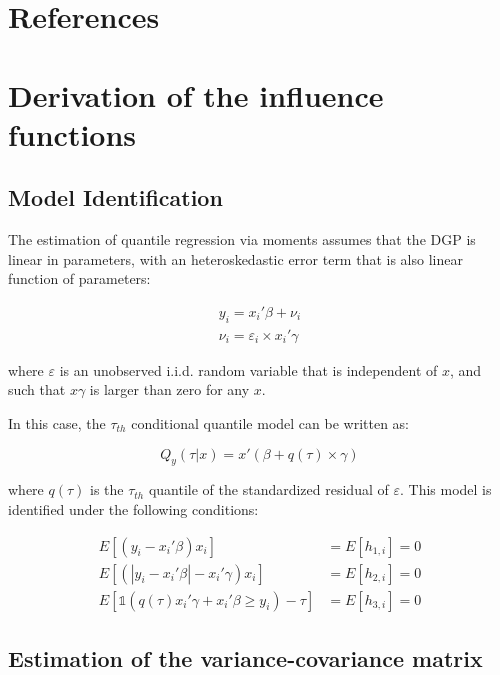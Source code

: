 \documentclass[
  authoryear,
  review,
  1p]{elsarticle}
\begin{document}
\section*{References}\label{references}

\renewcommand{\bibsection}{}


\newpage{}

\appendix

\section{Derivation of the influence
functions}\label{derivation-of-the-influence-functions}

\subsection{Model Identification}\label{model-identification}

The estimation of quantile regression via moments assumes that the DGP
is linear in parameters, with an heteroskedastic error term that is also
linear function of parameters:

\[\begin{aligned}
y_i = x_i'\beta + \nu_i \\
\nu_i = \varepsilon_i \times x_i'\gamma
\end{aligned}
\]

where \(\varepsilon\) is an unobserved i.i.d. random variable that is
independent of \(x\), and such that \(x\gamma\) is larger than zero for
any \(x\).

In this case, the \(\tau_{th}\) conditional quantile model can be
written as:

\[Q_y(\tau|x) = x'(\beta + q(\tau) \times \gamma)\]

where \(q(\tau)\) is the \(\tau_{th}\) quantile of the standardized
residual of \(\varepsilon\). This model is identified under the
following conditions:

\[\begin{aligned}
  E[(y_i-x_i'\beta)x_i ]  &= E[h_{1,i}]=0 \\
  E[ (|y_i-x_i'\beta|-x_i' \gamma) x_i ] &=E[h_{2,i}]=0 \\
  E\left[  \mathbb{1}\left( q(\tau) x_i'\gamma +x_i'\beta\geq  y_i  \right) - \tau \right] 
   &=E[h_{3,i}]=0 
\end{aligned}
\]

\subsection{Estimation of the variance-covariance
matrix}\label{estimation-of-the-variance-covariance-matrix}
\end{document}
